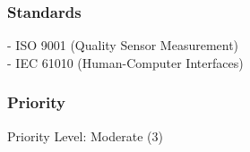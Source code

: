 \subsubsection{Standards}
- ISO 9001 (Quality Sensor Measurement)\\
- IEC 61010 (Human-Computer Interfaces)

\subsubsection{Priority}
Priority Level: Moderate (3)
